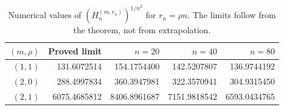 \begin{table}[htbp]
\centering
\small
\begin{tabular}{rrrrr}
\toprule
$(m,\rho)$ & Proved limit & $n=20$ & $n=40$ & $n=80$ \\
\midrule
$(1,1)$ & 131.6072514 & 154.1754400 & 142.5207807 & 136.9744192 \\
$(2,0)$ & 288.4997834 & 360.3947981 & 322.3570941 & 304.9315450 \\
$(2,1)$ & 6075.4685812 & 8406.8961687 & 7151.9818542 & 6593.0434765 \\
\bottomrule
\end{tabular}
\caption{Numerical values of $(H_n^{(m,r_n)})^{1/n^2}$ for $r_n=\rho n$. The limits follow from the theorem, not from extrapolation.}\label{tab:shifts}
\end{table}
